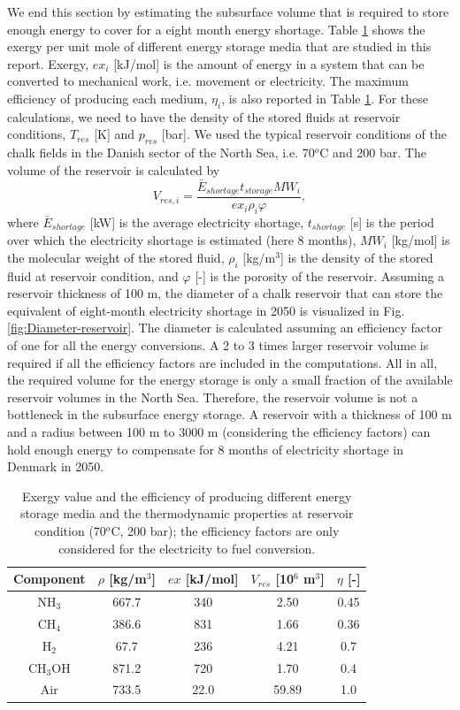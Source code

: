 \documentclass{ECOS_2021}
\begin{document}
We end this section by estimating the subsurface volume that is required
to store enough energy to cover for a eight month energy shortage.
Table \ref{tab:Exergy-value-efficiency} shows the exergy per unit
mole of different energy storage media that are studied in this report.
Exergy, $ex_{i}$ {[}kJ/mol{]} is the amount of energy in a system
that can be converted to mechanical work, i.e. movement or electricity.
The maximum efficiency of producing each medium, $\eta_{i}$, is also
reported in Table \ref{tab:Exergy-value-efficiency}. For these calculations,
we need to have the density of the stored fluids at reservoir conditions,
$T_{res}$ {[}K{]} and $p_{res}$ {[}bar{]}. We used the typical reservoir
conditions of the chalk fields in the Danish sector of the North Sea,
i.e. 70$^{o}$C and 200 bar. The volume of the reservoir is calculated
by
\[
V_{res,i}=\frac{\bar{E}_{shortage}t_{storage}MW_{i}}{ex_{i}\rho_{i}\varphi},
\]
where $\bar{E}_{shortage}$ {[}kW{]} is the average electricity shortage,
$t_{shortage}$ {[}s{]} is the period over which the electricity shortage
is estimated (here 8 months), $MW_{i}$ {[}kg/mol{]} is the molecular
weight of the stored fluid, $\rho_{i}$ {[}kg/m$^{3}${]} is the density
of the stored fluid at reservoir condition, and $\varphi$ {[}-{]}
is the porosity of the reservoir. Assuming a reservoir thickness of
100 m, the diameter of a chalk reservoir that can store the equivalent
of eight-month electricity shortage in 2050 is visualized in Fig.
\ref{fig:Diameter-reservoir}. The diameter is calculated assuming
an efficiency factor of one for all the energy conversions. A 2 to
3 times larger reservoir volume is required if all the efficiency
factors are included in the computations. All in all, the required
volume for the energy storage is only a small fraction of the available
reservoir volumes in the North Sea. Therefore, the reservoir volume
is not a bottleneck in the subsurface energy storage. A reservoir
with a thickness of 100 m and a radius between 100 m to 3000 m (considering
the efficiency factors) can hold enough energy to compensate for 8
months of electricity shortage in Denmark in 2050. 

\begin{table}[H]
\caption{\label{tab:Exergy-value-efficiency}Exergy value and the efficiency
of producing different energy storage media and the thermodynamic
properties at reservoir condition (70$^{o}$C, 200 bar); the efficiency
factors are only considered for the electricity to fuel conversion.}

\begin{tabular}{|c|c|c|c|c|}
\hline 
Component & $\rho$ {[}kg/m$^{3}${]} & $ex$ {[}kJ/mol{]} & $V_{res}$ {[}10$^{6}$ m$^{3}${]} & $\eta$ {[}-{]}\tabularnewline
\hline 
\hline 
NH$_{3}$ & 667.7 & 340 & 2.50 & 0.45\tabularnewline
\hline 
CH$_{4}$ & 386.6 & 831 & 1.66 & 0.36\tabularnewline
\hline 
H$_{2}$ & 67.7 & 236 & 4.21 & 0.7\tabularnewline
\hline 
CH$_{3}$OH & 871.2 & 720 & 1.70 & 0.4\tabularnewline
\hline 
Air & 733.5 & 22.0 & 59.89 & 1.0\tabularnewline
\hline 
\end{tabular}
\end{table}
\end{document}
